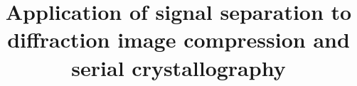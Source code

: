 \documentclass[a4paper,12pt,oneside]{article}              %
\begin{document}
\linenumbers



\title{Application of signal separation to diffraction image compression and serial crystallography}










\end{document}
